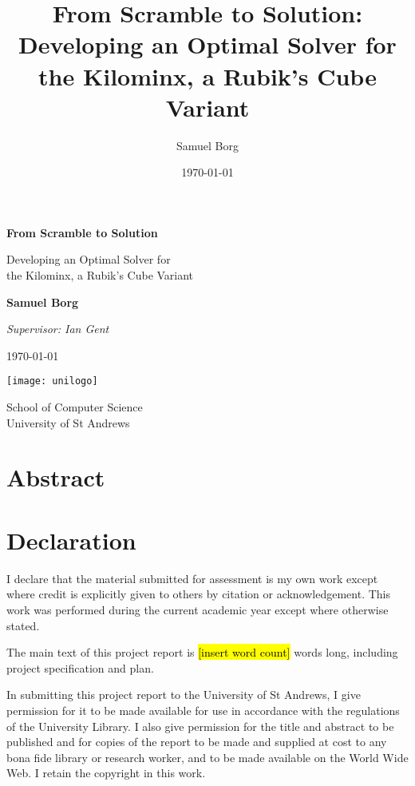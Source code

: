 \documentclass[12pt]{report}
\title{From Scramble to Solution: Developing an Optimal Solver for the Kilominx, a Rubik's Cube Variant}
\author{Samuel Borg}
\date{\today}
\newcommand{\hlc}[2][yellow]{{%
    \colorlet{foo}{#1}%
    \sethlcolor{foo}\hl{#2}}%
}
\begin{document}
\begin{titlepage}
    \begin{center}
        \vspace*{1.5cm}
            
        \Huge
        \textbf{From Scramble to Solution}
            
        \vspace{0.5cm}
        \LARGE
        Developing an Optimal Solver for \\ the Kilominx, a Rubik's Cube Variant

        \vspace{2cm}
        \textbf{Samuel Borg}

        \Large
        \textit{Supervisor: Ian Gent}

        \vspace{0.5cm}

        \large
        \today

        \vspace{2.5cm}

        \texttt{[image: unilogo]}

        \Large
        \vspace{0.5cm}
        School of Computer Science\\
        University of St Andrews
    \end{center}
\end{titlepage}

\chapter*{Abstract}


\chapter*{Declaration}
I declare that the material submitted for assessment is my own work except where credit is explicitly given to others by citation or acknowledgement. This work was performed during the current academic year except where otherwise stated.

The main text of this project report is \hlc[yellow]{[insert word count]} words long, including project specification and plan.

In submitting this project report to the University of St Andrews, I give permission for it to be made available for use in accordance with the regulations of the University Library. I also give permission for the title and abstract to be published and for copies of the report to be made and supplied at cost to any bona fide library or research worker, and to be made available on the World Wide Web. I retain the copyright in this work.
\end{document}
